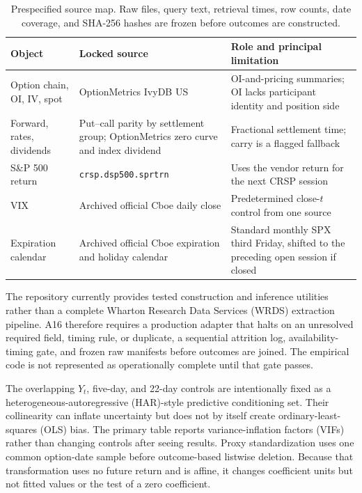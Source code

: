 \documentclass[11pt]{article}
\begin{document}
\begin{table}[!htbp]
\centering
\begin{tabular}{>{\raggedright\arraybackslash}p{}
                >{\raggedright\arraybackslash}p{}
                >{\raggedright\arraybackslash}p{}}
\toprule
Object & Locked source & Role and principal limitation\\
\midrule
Option chain, OI, IV, spot & OptionMetrics IvyDB US & OI-and-pricing summaries; OI lacks
participant identity and position side\\
Forward, rates, dividends & Put--call parity by settlement group; OptionMetrics zero curve
and index dividend & Fractional settlement time; carry is a flagged fallback\\
S\&P 500 return & \texttt{crsp.dsp500.sprtrn} & Uses the vendor return for the next CRSP
session\\
VIX & Archived official Cboe daily close & Predetermined close-$t$ control from one source\\
Expiration calendar & Archived official Cboe expiration and holiday calendar & Standard
monthly SPX third Friday, shifted to the preceding open session if closed\\
\bottomrule
\end{tabular}
\caption{Prespecified source map.  Raw files, query text, retrieval times, row counts, date
coverage, and SHA-256 hashes are frozen before outcomes are constructed.}
\label{tab:data-map}
\end{table}
\FloatBarrier

The repository currently provides tested construction and inference utilities rather than a
complete Wharton Research Data Services (WRDS) extraction pipeline.  A16 therefore requires
a production adapter that halts on an unresolved required field, timing rule, or duplicate,
a sequential attrition log, availability-timing gate, and frozen raw manifests before outcomes
are joined.  The empirical code is not represented as operationally complete until that gate
passes.

The overlapping $Y_t$, five-day, and 22-day controls are intentionally fixed as a
heterogeneous-autoregressive (HAR)-style predictive conditioning set.  Their collinearity
can inflate uncertainty but does not by itself create ordinary-least-squares (OLS) bias.
The primary table reports variance-inflation factors (VIFs) rather than changing controls
after seeing results.  Proxy standardization uses one common
option-date sample before outcome-based listwise deletion.  Because that transformation
uses no future return and is affine, it changes coefficient units but not fitted values or
the test of a zero coefficient.
\end{document}
